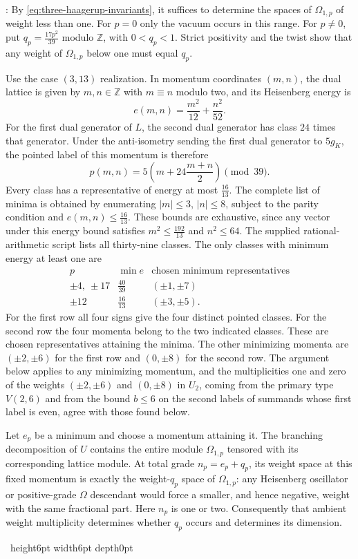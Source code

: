 \documentclass[leqno]{article}
\newcommand{\Z}{\ensuremath{\mathbb{Z}}}
\renewcommand{\leq}{\ensuremath{\leqslant}}
\newcommand{\qed}{\hfill \vrule height6pt  width6pt depth0pt}
\newenvironment{proof}[1][]{\noindent {\it Proof #1} : }{\hbox{~}\qed
\smallskip
}
\numberwithin{equation}{section}
\begin{document}
\begin{proof}
By \eqref{eq:three-haagerup-invariants}, it suffices to determine the spaces of $\Omega_{1,p}$ of weight less than one. For $p = 0$ only the vacuum occurs in this range. For $p \neq 0$, put $q_p = \frac{17p^2}{39}$ modulo $\Z$, with $0<q_p<1$. Strict positivity and the twist show that any weight of $\Omega_{1,p}$ below one must equal $q_p$.

Use the case $(3,13)$ realization. In momentum coordinates $(m,n)$, the dual lattice is given by $m,n \in \Z$ with $m \equiv n$ modulo two, and its Heisenberg energy is
\[
e(m,n) = \frac{m^2}{12}+\frac{n^2}{52}.
\]
For the first dual generator of $L$, the second dual generator has class $24$ times that generator. Under the anti-isometry sending the first dual generator to $5g_K$, the pointed label of this momentum is therefore
\[
p(m,n) = 5\left(m+24\frac{m+n}{2}\right) \pmod {39}.
\]
Every class has a representative of energy at most $\frac{16}{13}$. The complete list of minima is obtained by enumerating $|m|\leq3$, $|n|\leq8$, subject to the parity condition and $e(m,n)\leq\frac{16}{13}$. These bounds are exhaustive, since any vector under this energy bound satisfies $m^2\leq\frac{192}{13}$ and $n^2\leq64$. The supplied rational-arithmetic script lists all thirty-nine classes. The only classes with minimum energy at least one are
\[
\begin{array}{c|c|c}
p&\min e&\text{chosen minimum representatives}\\
\hline
\pm4,\ \pm17&\frac{40}{39}&(\pm1,\pm7)\\
\pm12&\frac{16}{13}&(\pm3,\pm5).
\end{array}
\]
For the first row all four signs give the four distinct pointed classes. For the second row the four momenta belong to the two indicated classes. These are chosen representatives attaining the minima. The other minimizing momenta are $(\pm2,\pm6)$ for the first row and $(0,\pm8)$ for the second row. The argument below applies to any minimizing momentum, and the multiplicities one and zero of the weights $(\pm2,\pm6)$ and $(0,\pm8)$ in $U_2$, coming from the primary type $V(2,6)$ and from the bound $b \leq 6$ on the second labels of summands whose first label is even, agree with those found below.

Let $e_p$ be a minimum and choose a momentum attaining it. The branching decomposition of $U$ contains the entire module $\Omega_{1,p}$ tensored with its corresponding lattice module. At total grade $n_p = e_p+q_p$, its weight space at this fixed momentum is exactly the weight-$q_p$ space of $\Omega_{1,p}$: any Heisenberg oscillator or positive-grade $\Omega$ descendant would force a smaller, and hence negative, weight with the same fractional part. Here $n_p$ is one or two. Consequently that ambient weight multiplicity determines whether $q_p$ occurs and determines its dimension.


\end{proof}
\end{document}
